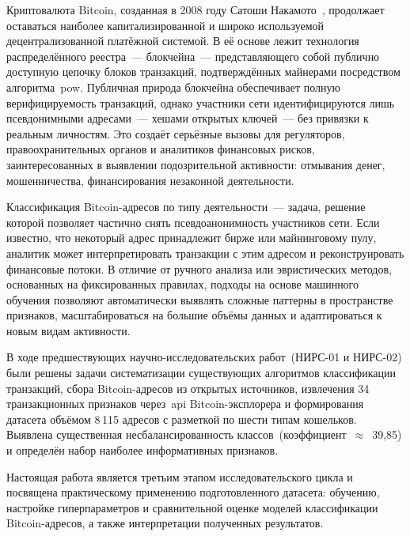 \introduction %

Криптовалюта Bitcoin, созданная в 2008 году Сатоши Накамото~\cite{bitcoin_whitepaper}, продолжает оставаться наиболее капитализированной и широко используемой децентрализованной платёжной системой. В её основе лежит технология распределённого реестра~--- блокчейна~--- представляющего собой публично доступную цепочку блоков транзакций, подтверждённых майнерами посредством алгоритма~\acrshort{pow}. Публичная природа блокчейна обеспечивает полную верифицируемость транзакций, однако участники сети идентифицируются лишь псевдонимными адресами~--- хешами открытых ключей~--- без привязки к реальным личностям. Это создаёт серьёзные вызовы для регуляторов, правоохранительных органов и аналитиков финансовых рисков, заинтересованных в выявлении подозрительной активности: отмывания денег, мошенничества, финансирования незаконной деятельности.

Классификация Bitcoin-адресов по типу деятельности~--- задача, решение которой позволяет частично снять псевдоанонимность участников сети. Если известно, что некоторый адрес принадлежит бирже или майнинговому пулу, аналитик может интерпретировать транзакции с этим адресом и реконструировать финансовые потоки. В отличие от ручного анализа или эвристических методов, основанных на фиксированных правилах, подходы на основе машинного обучения позволяют автоматически выявлять сложные паттерны в пространстве признаков, масштабироваться на большие объёмы данных и адаптироваться к новым видам активности.

В ходе предшествующих научно-исследовательских работ~(НИРС-01 и НИРС-02) были решены задачи систематизации существующих алгоритмов классификации транзакций, сбора Bitcoin-адресов из открытых источников, извлечения 34 транзакционных признаков через~\acrshort{api} Bitcoin-эксплорера и формирования датасета объёмом 8\,115 адресов с разметкой по шести типам кошельков. Выявлена существенная несбалансированность классов~(коэффициент~$\approx$~39,85) и определён набор наиболее информативных признаков.

Настоящая работа является третьим этапом исследовательского цикла и посвящена практическому применению подготовленного датасета: обучению, настройке гиперпараметров и сравнительной оценке моделей классификации Bitcoin-адресов, а также интерпретации полученных результатов.

